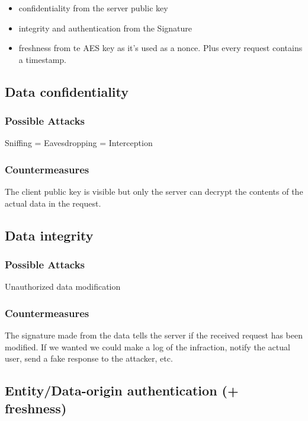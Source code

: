 \documentclass[10pt,twocolumn]{article}
\begin{document}
\begin{itemize}
    \item confidentiality from the server public key
    \item integrity and authentication from the Signature
    \item freshness from te AES key as it's used as a nonce. Plus every request contains a timestamp.
\end{itemize}

\subsection{Data confidentiality}

\subsubsection*{Possible Attacks}

Sniffing = Eavesdropping = Interception

\subsubsection*{Countermeasures}

The client public key is visible but only the server can decrypt the contents of the actual data in the request.

\subsection{Data integrity}

\subsubsection*{Possible Attacks}

Unauthorized data modification

\subsubsection*{Countermeasures}

The signature made from the data tells the server if the received request has been modified.
If we wanted we could make a log of the infraction, notify the actual user, send a fake response to the attacker, etc.

\subsection{Entity/Data-origin authentication (+ freshness)}
\end{document}
